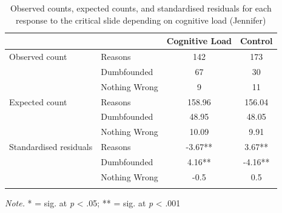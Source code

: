 \documentclass[
  american,
  man,floatsintext]{apa7}
\begin{document}
\begin{table}[tbp]

\begin{center}
\begin{threeparttable}

\caption{\label{tab:tabS6tab1dumbJennifer}Observed counts, expected counts, and standardised residuals for each response to the critical slide depending on cognitive load (Jennifer)}

\begin{tabular}{llcc}
\toprule
 & \multicolumn{1}{c}{} & \multicolumn{1}{c}{Cognitive Load} & \multicolumn{1}{c}{Control}\\
\midrule
Observed count & Reasons & 142 & 173\\
 & Dumbfounded & 67 & 30\\
 & Nothing Wrong & 9 & 11\\
Expected count & Reasons & 158.96 & 156.04\\
 & Dumbfounded & 48.95 & 48.05\\
 & Nothing Wrong & 10.09 & 9.91\\
Standardised residuals & Reasons & -3.67** & 3.67**\\
 & Dumbfounded & 4.16** & -4.16**\\
 & Nothing Wrong & -0.5 & 0.5\\
\bottomrule
\addlinespace
\end{tabular}

\begin{tablenotes}[para]
\normalsize{\textit{Note.} * = sig. at \emph{p} < .05; ** = sig. at \emph{p} < .001}
\end{tablenotes}

\end{threeparttable}
\end{center}

\end{table}
\end{document}
